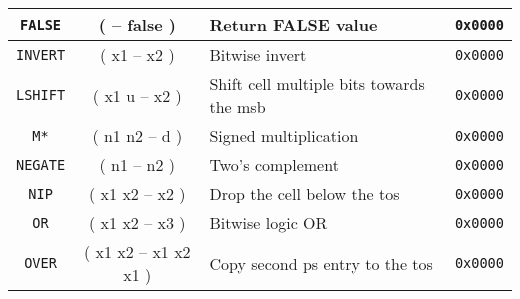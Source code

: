 \begin{center}
\begin{longtable}{|c|c|l|c|}
      \texttt{FALSE}                          &
      ( -- false )                            &
      Return FALSE value                      &
      \texttt{0x0000}                           \\ \hline
                              
      \texttt{INVERT}                         &
      ( x1 -- x2 )                            &
      Bitwise invert                          &
      \texttt{0x0000}                           \\ \hline

      \texttt{LSHIFT}                         &
      ( x1 u -- x2 )                          &
      Shift cell multiple bits towards the \gls{msb} &
      \texttt{0x0000}                           \\ \hline

      \texttt{M*}                             &
      ( n1 n2 -- d )                          &
      Signed multiplication                   &
      \texttt{0x0000}                           \\ \hline

      \texttt{NEGATE}                         &
      ( n1 -- n2 )                            &
      Two's complement                        &
      \texttt{0x0000}                           \\ \hline

      \texttt{NIP}                            &
      ( x1 x2 -- x2 )                         &
      Drop the cell below the \gls{tos}       &
      \texttt{0x0000}                           \\ \hline
                              
      \texttt{OR}                            &
      ( x1 x2 -- x3 )                        &
      Bitwise logic OR                       &
      \texttt{0x0000}                           \\ \hline
                                         
      \texttt{OVER}                          &
      ( x1 x2 -- x1 x2 x1 )                  &
      Copy second \gls{ps} entry to the \gls{tos} &
      \texttt{0x0000}                           \\ \hline
                                         

\end{longtable}
\end{center}
